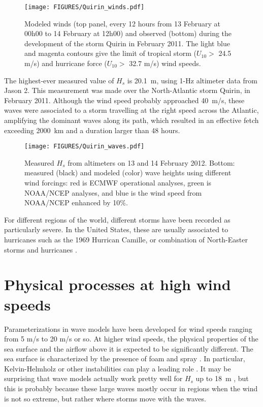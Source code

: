 \begin{figure}[htb]
\centerline{\texttt{[image: FIGURES/Quirin\_winds.pdf]}}
  \caption{Modeled winds (top panel, every 12 hours from 13 February at 00h00 to  14 February at  12h00) and  observed  (bottom) 
  during the development of the storm Quirin in February 2011. The light blue and magenta contours  give the 
  limit of tropical storm  ($U_{10}>$  24.5 m/s) and hurricane force ($U_{10}>$  32.7 m/s) wind speeds.}
  \label{fig:Quirin_winds}
\end{figure}
The highest-ever measured value of $H_s$ is  20.1~m, using 1-Hz altimeter data from Jason 2. This measurement was made over the North-Atlantic storm 
Quirin, in February 2011. Although the wind speed probably approached 40~m/s, these waves were associated to a storm travelling at the right 
speed across the Atlantic, amplifying the dominant waves along its path, which resulted in an effective fetch exceeding 2000~km and a duration 
larger than 48 hours. 


\begin{figure}[htb]
\centerline{\texttt{[image: FIGURES/Quirin\_waves.pdf]}}
  \caption{Measured $H_s$ from altimeters on 13 and 14 February 2012. Bottom: measured (black) and modeled  (color) wave heights using 
  different wind forcings: red is ECMWF operational analyses, green is NOAA/NCEP analyses, and blue is the wind speed from NOAA/NCEP enhanced by 10\%.}
  \label{fig:Quirin_waves}
\end{figure}

For different regions of the world, different storms have been recorded as particularly severe. In the United States, these are usually associated to hurricanes 
such as the 1969 Hurrican Camille, or combination of North-Easter storms and hurricanes \cite[e.g. the 1991 Perfect Storm that inspired the movie, see][]{Bromirski2001}. 

\section{Physical processes at high wind speeds}
Parameterizations in wave models have been developed for wind speeds ranging from 5 m/s \citep{Snyder&al.1981} to 20 m/s or so. At higher wind speeds, 
the physical properties of the sea surface and the airflow above it is expected to be significantly different. The sea surface is 
characterized by the presence of foam and spray \citep[e.g.][]{Holthuijsen&al.2012}. In particular, Kelvin-Helmholz or other 
instabilities can play a leading role \cite{Soloviev&al.2014}. It may be surprising that wave models actually work pretty well for $H_s$ up to 18~m \citep{Rascle&Ardhuin2013},
but this is probably because these large waves mostly occur in regions when the wind is not so extreme, but rather where storms move with the waves. 

